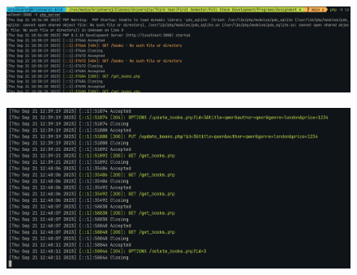 \documentclass[11pt]{article}
\begin{document}
\begin{figure}[H]
    \centering
    \includegraphics[height=.95\textwidth]{screenshots/php server 1.png}
    \caption{}
\end{figure}
\begin{figure}[H]
    \centering
    \includegraphics[height=.95\textwidth]{screenshots/php server 2.png}
    \caption{}
\end{figure}
\end{document}
